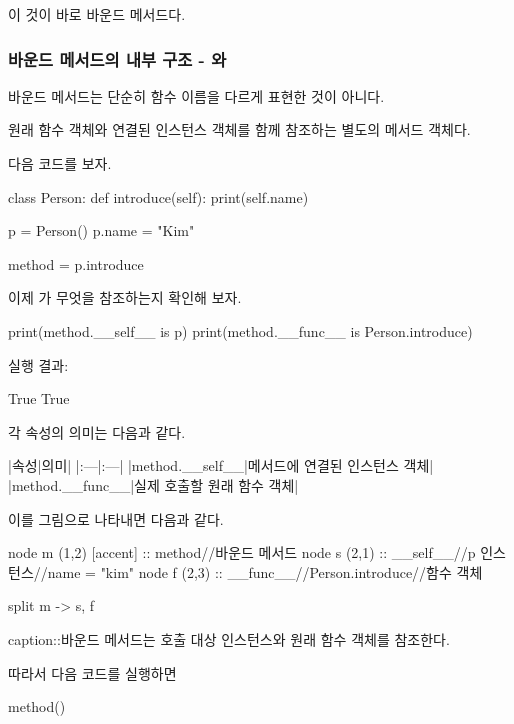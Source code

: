 이 것이 바로 바운드 메서드다.

\subsubsection{바운드 메서드의 내부 구조 - 와 }

바운드 메서드는 단순히 함수 이름을 다르게 표현한 것이 아니다.

원래 함수 객체와 연결된 인스턴스 객체를 함께 참조하는 별도의 메서드 객체다.

다음 코드를 보자.

\begin{dhkcode}
class Person:
    def introduce(self):
        print(self.name)

p = Person()
p.name = "Kim"

method = p.introduce
\end{dhkcode}

이제 가 무엇을 참조하는지 확인해 보자.

\begin{dhkcode}
print(method.__self__ is p)
print(method.__func__ is Person.introduce)
\end{dhkcode}

실행 결과:

\begin{dhkzsh}
True
True
\end{dhkzsh}

각 속성의 의미는 다음과 같다.

\begin{dhktable}
|속성|의미|
|:---|:---|
|method.__self__|메서드에 연결된 인스턴스 객체|
|method.__func__|실제 호출할 원래 함수 객체|
\end{dhktable}

이를 그림으로 나타내면 다음과 같다.

\begin{dhkgraph}
node m (1,2) [accent] :: method//바운드 메서드
node s (2,1) :: __self__//p 인스턴스//name = "kim"
node f (2,3) :: __func__//Person.introduce//함수 객체

split m -> s, f

caption::바운드 메서드는 호출 대상 인스턴스와 원래 함수 객체를 참조한다.
\end{dhkgraph}

따라서 다음 코드를 실행하면

\begin{dhkcode}
method()
\end{dhkcode}

